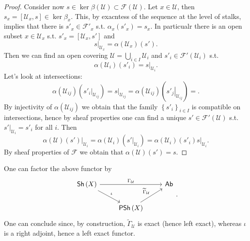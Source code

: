 \documentclass[../Main]{subfiles}
\begin{document}
\begin{proof}
	Consider now $s \in \ker \beta(\mathcal{U}) \subset \mathcal{F}(\mathcal{U})$.
	Let $x \in \mathcal{U}$, then $s_x = \left[ \mathcal{U}_x, s \right] \in \ker \beta_x$.
	This, by exacntess of the sequence at the level of stalks, implies that
	there is $s'_x \in \mathcal{F}'_{x}$ s.t. $\alpha_x(s'_x) = s_x$.
	In particualr there is an open subset $x \in \mathcal{U}_x$ s.t.
	$s'_x = \left[ \mathcal{U}_x, s' \right]$ and
	\begin{equation}
		\left.s\right|_{\mathcal{U}_x} = \alpha(\mathcal{U}_x)(s')
	.\end{equation} 
	Then we can find an open covering $\mathcal{U} = \bigcup_{i \in I} \mathcal{U}_i$
	and $s'_i \in \mathcal{F}'(\mathcal{U}_i)$ s.t.
	\begin{equation}
		\alpha(\mathcal{U}_i)(s'_i) = \left.s\right|_{\mathcal{U}_i} 
	.\end{equation} 
	Let's look at intersections:
	\begin{equation}
		\alpha(\mathcal{U}_{ij})(\left.s'_i\right|_{\mathcal{U}_{ij}}) =
			\left.s\right|_{\mathcal{U}_{ij}} =
				\alpha(\mathcal{U}_{ij})(\left.s'_j\right|_{\mathcal{U}_{ij}}) =
	.\end{equation} 
	By injectivity of $\alpha(\mathcal{U}_{ij})$
	we obtain that the family $\left\{ s'_i \right\}_{i \in I}$ is
	compatible on intersections, hence by sheaf properties one
	can find a unique $s' \in \mathcal{F}'(\mathcal{U})$ s.t.
	$\left.s'\right|_{\mathcal{U}_i} = s'_i$ for all $i$.
	Then
	\begin{equation}
		\alpha(\mathcal{U})(s')|_{\mathcal{U}_i} =
		\alpha(\mathcal{U}_i)(\left.s'\right|_{\mathcal{U}_i} ) =
		\alpha(\mathcal{U}_i)(s'_i)
		\left.s\right|_{\mathcal{U}_i} 
	.\end{equation} 
	By sheaf properties of $\mathcal{F}$ we obtain that $\alpha(\mathcal{U})(s') = s$.
\end{proof}
\begin{rem}
	One can factor the above functor by
	\begin{equation}
	\begin{tikzcd}
		\mathsf{Sh}\left(X\right) \arrow[rr, "\Gamma_{\mathcal{U}}", rightarrow] 
		\arrow[rd, "\iota", rightarrow] & &
		\mathsf{Ab}\\
		&
		\mathsf{PSh}\left( X \right) \arrow[ru, "\widetilde{\Gamma}_{\mathcal{U}}", rightarrow] &
	\end{tikzcd}
	.\end{equation} 
	One can conclude since, by construction, $\widetilde{\Gamma}_{\mathcal{U}}$ is
	exact (hence left exact), whereas $\iota$ is a right adjoint,
	hence a left exact functor.
\end{rem}
\end{document}
